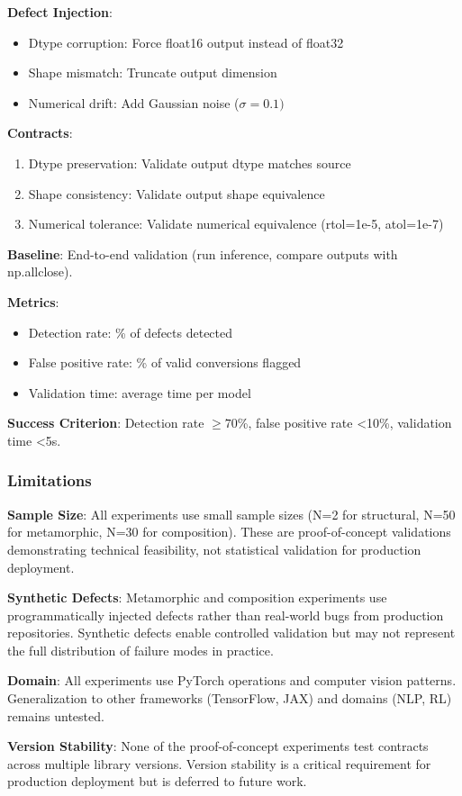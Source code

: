 \textbf{Defect Injection}:
\begin{itemize}
\item Dtype corruption: Force float16 output instead of float32
\item Shape mismatch: Truncate output dimension
\item Numerical drift: Add Gaussian noise ($\sigma =0.1)$
\end{itemize}

\textbf{Contracts}:
\begin{enumerate}
\item Dtype preservation: Validate output dtype matches source
\item Shape consistency: Validate output shape equivalence
\item Numerical tolerance: Validate numerical equivalence (rtol=1e-5, atol=1e-7)
\end{enumerate}

\textbf{Baseline}: End-to-end validation (run inference, compare outputs with np.allclose).

\textbf{Metrics}:
\begin{itemize}
\item Detection rate: \% of defects detected
\item False positive rate: \% of valid conversions flagged
\item Validation time: average time per model
\end{itemize}

\textbf{Success Criterion}: Detection rate $\geq 70$\%, false positive rate <10\%, validation time <5s.

\subsubsection{Limitations}

\textbf{Sample Size}: All experiments use small sample sizes (N=2 for structural, N=50 for metamorphic, N=30 for composition). These are proof-of-concept validations demonstrating technical feasibility, not statistical validation for production deployment.

\textbf{Synthetic Defects}: Metamorphic and composition experiments use programmatically injected defects rather than real-world bugs from production repositories. Synthetic defects enable controlled validation but may not represent the full distribution of failure modes in practice.

\textbf{Domain}: All experiments use PyTorch operations and computer vision patterns. Generalization to other frameworks (TensorFlow, JAX) and domains (NLP, RL) remains untested.

\textbf{Version Stability}: None of the proof-of-concept experiments test contracts across multiple library versions. Version stability is a critical requirement for production deployment but is deferred to future work.
